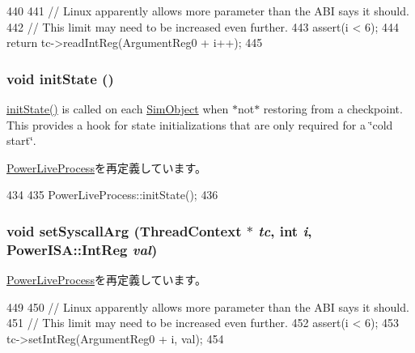 \begin{DoxyCode}
440 {
441     // Linux apparently allows more parameter than the ABI says it should.
442     // This limit may need to be increased even further.
443     assert(i < 6);
444     return tc->readIntReg(ArgumentReg0 + i++);
445 }
\end{DoxyCode}
\hypertarget{classPowerLinuxProcess_a3c34ea9b29f410748d4435a667484924}{
\subsubsection[{initState}]{\setlength{\rightskip}{0pt plus 5cm}void initState ()}}
\label{classPowerLinuxProcess_a3c34ea9b29f410748d4435a667484924}
\hyperlink{classPowerLinuxProcess_a3c34ea9b29f410748d4435a667484924}{initState()} is called on each \hyperlink{classSimObject}{SimObject} when $\ast$not$\ast$ restoring from a checkpoint. This provides a hook for state initializations that are only required for a \char`\"{}cold start\char`\"{}. 

\hyperlink{classPowerLiveProcess_a3c34ea9b29f410748d4435a667484924}{PowerLiveProcess}を再定義しています。


\begin{DoxyCode}
434 {
435     PowerLiveProcess::initState();
436 }
\end{DoxyCode}
\hypertarget{classPowerLinuxProcess_a1e515b39cc799824d1dd93d40ba28416}{
\subsubsection[{setSyscallArg}]{\setlength{\rightskip}{0pt plus 5cm}void setSyscallArg ({\bf ThreadContext} $\ast$ {\em tc}, \/  int {\em i}, \/  {\bf PowerISA::IntReg} {\em val})}}
\label{classPowerLinuxProcess_a1e515b39cc799824d1dd93d40ba28416}


\hyperlink{classPowerLiveProcess_a1e515b39cc799824d1dd93d40ba28416}{PowerLiveProcess}を再定義しています。


\begin{DoxyCode}
449 {
450     // Linux apparently allows more parameter than the ABI says it should.
451     // This limit may need to be increased even further.
452     assert(i < 6);
453     tc->setIntReg(ArgumentReg0 + i, val);
454 }
\end{DoxyCode}


